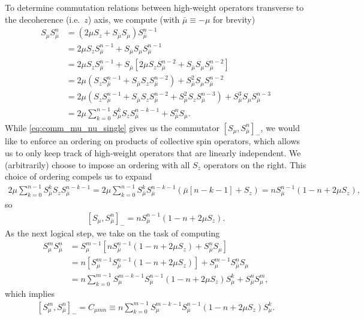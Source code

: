 \documentclass[aps,notitlepage,nofootinbib,11pt]{revtex4-1}
\newcommand{\p}[1]{\left(#1\right)} %
\renewcommand{\sp}[1]{\left[#1\right]} %
\newcommand{\bmu}{{\bar\mu}}
\newcommand{\1}{\mathds{1}}
\begin{document}
To determine commutation relations between high-weight operators
transverse to the decoherence (i.e.~$z$) axis, we compute (with
$\bmu\equiv-\mu$ for brevity)
\begin{align}
  S_\mu S_\bmu^n
  &= \p{2\mu S_z + S_\bmu S_\mu} S_\bmu^{n-1} \\
  &= 2\mu S_z S_\bmu^{n-1} + S_\bmu S_\mu S_\bmu^{n-1} \\
  &= 2\mu S_z S_\bmu^{n-1}
  + S_\bmu \sp{2\mu S_z S_\bmu^{n-2}
    + S_\bmu S_\mu S_\bmu^{n-2}} \\
  &= 2\mu \p{S_z S_\bmu^{n-1} + S_\bmu S_z S_\bmu ^{n-2}}
  + S_\bmu^2 S_\mu S_\bmu^{n-2} \\
  &= 2\mu \p{S_z S_\bmu^{n-1} + S_\bmu S_z S_\bmu ^{n-2}
    + S_\bmu^2 S_z S_\bmu ^{n-3}} + S_\bmu^3 S_\mu S_\bmu^{n-3} \\
  &= 2\mu \sum_{k=0}^{n-1} S_\bmu^k S_z S_\bmu^{n-k-1}
  + S_\bmu^n S_\mu.
  \label{eq:comm_mu_nu_single}
\end{align}
While \eqref{eq:comm_mu_nu_single} gives us the commutator
$\sp{S_\mu,S_\bmu^n}_-$, we would like to enforce an ordering on
products of collective spin operators, which allows us to only keep
track of high-weight operators that are linearly independent.  We
(arbitrarily) choose to impose an ordering with all $S_z$ operators on
the right.  This choice of ordering compels us to expand
\begin{align}
  2 \mu \sum_{k=0}^{n-1} S_\bmu^k S_z S_\bmu^{n-k-1}
  = 2 \mu \sum_{k=0}^{n-1}
  S_\bmu^k S_\bmu^{n-k-1} \p{\bmu\sp{n-k-1} + S_z}
  = n S_\bmu^{n-1}\p{1 - n + 2\mu S_z},
\end{align}
so
\begin{align}
  \sp{S_\mu, S_\bmu^n}_-
  = n S_\bmu^{n-1}\p{1 - n + 2\mu S_z}.
\end{align}
As the next logical step, we take on the task of computing
\begin{align}
  S_\mu^m S_\bmu^n
  &= S_\mu^{m-1} \sp{n S_\bmu^{n-1}\p{1 - n + 2\mu S_z}
    + S_\bmu^n S_\mu} \\
  &= n \sp{S_\mu^{m-1} S_\bmu^{n-1} \p{1 - n + 2\mu S_z}}
  + S_\mu^{m-1} S_\bmu^n S_\mu \\
  &= n \sum_{k=0}^{m-1} S_\mu^{m-k-1} S_\bmu^{n-1}
  \p{1 - n + 2\mu S_z} S_\mu^k + S_\bmu^n S_\mu^m,
\end{align}
which implies
\begin{align}
  \sp{S_\mu^m, S_\bmu^n}_-
  = C_{\mu mn}
  \equiv n \sum_{k=0}^{m-1} S_\mu^{m-k-1} S_\bmu^{n-1}
  \p{1 - n + 2\mu S_z} S_\mu^k.
\end{align}
\end{document}
